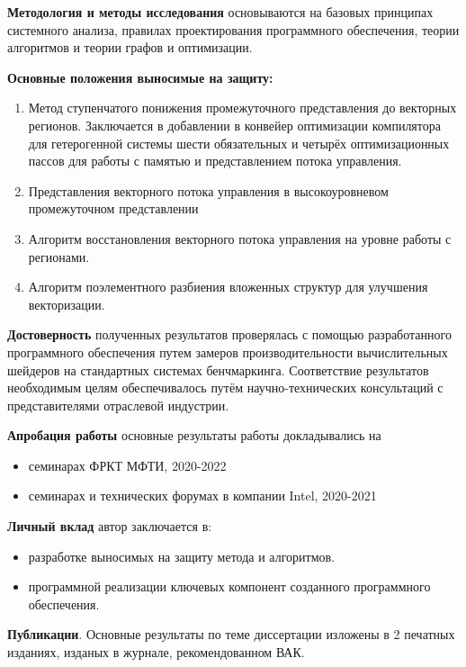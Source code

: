 \textbf{Методология и методы исследования} основываются на базовых принципах системного анализа, правилах проектирования программного обеспечения, теории алгоритмов и теории графов и оптимизации.

\textbf{Основные положения выносимые на защиту:}
\begin{enumerate}[beginpenalty=10000]
  \item Метод ступенчатого понижения промежуточного представления до векторных регионов. Заключается в добавлении в конвейер оптимизации компилятора для гетерогенной системы шести обязательных и четырёх оптимизационных пассов для работы с памятью и представлением потока управления.
  \item Представления векторного потока управления в высокоуровневом промежуточном представлении 
  \item Алгоритм восстановления векторного потока управления на уровне работы с регионами.
  \item Алгоритм поэлементного разбиения вложенных структур для улучшения векторизации.
\end{enumerate}

\textbf{Достоверность} полученных результатов проверялась с помощью разработанного программного обеспечения путем замеров производительности вычислительных шейдеров на стандартных системах бенчмаркинга. Соответствие результатов необходимым целям обеспечивалось путём научно-технических консультаций с представителями отраслевой индустрии.

\textbf{Апробация работы} основные результаты работы докладывались на
\begin{itemize}
  \item семинарах ФРКТ МФТИ, 2020-2022
  \item семинарах и технических форумах в компании Intel, 2020-2021
\end{itemize}

\textbf{Личный вклад} автор заключается в:
\begin{itemize}
  \item разработке выносимых на защиту метода и алгоритмов.
  \item программной реализации ключевых компонент созданного программного обеспечения.
\end{itemize}

\textbf{Публикации}. Основные результаты по теме диссертации изложены в 2 печатных изданиях, изданых в журнале, рекомендованном ВАК.

\iffalse

